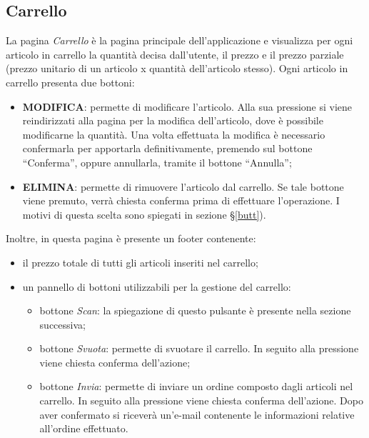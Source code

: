\documentclass[12pt, a4paper, titlepage]{report}
\begin{document}
	\subsection{Carrello}
	La pagina \textit{Carrello} è la pagina principale dell'applicazione e visualizza per ogni articolo in carrello la quantità decisa dall'utente, il prezzo e il prezzo parziale (prezzo unitario di un articolo x quantità dell'articolo stesso). Ogni articolo in carrello presenta due bottoni: 
	\begin{itemize}
		\item \textbf{MODIFICA}: permette di modificare l'articolo. Alla sua pressione si viene reindirizzati alla pagina per la modifica dell'articolo, dove è possibile modificarne la quantità. Una volta effettuata la modifica è necessario confermarla per apportarla definitivamente, premendo sul bottone ``Conferma'', oppure annullarla, tramite il bottone ``Annulla'';
		\item \textbf{ELIMINA}: permette di rimuovere l'articolo dal carrello. Se tale bottone viene premuto, verrà chiesta conferma prima di effettuare l'operazione. I motivi di questa scelta sono spiegati in sezione §\ref{butt}).
	\end{itemize}
	Inoltre, in questa pagina è presente un footer contenente:
	\begin{itemize}
		\item il prezzo totale di tutti gli articoli inseriti nel carrello;
		\item un pannello di bottoni utilizzabili per la gestione del carrello:
		\begin{itemize}
			\item bottone \textit{Scan}: la spiegazione di questo pulsante è presente nella sezione successiva;
			\item bottone \textit{Svuota}: permette di svuotare il carrello. In seguito alla pressione viene chiesta conferma dell'azione;
			\item bottone \textit{Invia}: permette di inviare un ordine composto dagli articoli nel carrello. In seguito alla pressione viene chiesta conferma dell'azione. Dopo aver confermato si riceverà un'e-mail contenente le informazioni relative all'ordine effettuato.
		\end{itemize}
	\end{itemize} 
	
\end{document}
